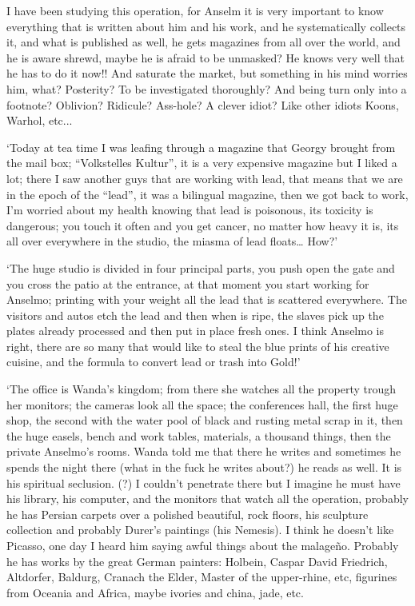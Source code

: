 \documentclass[smalldemyvopaper,11pt,twoside,onecolumn,openright,extrafontsizes]{memoir}
\begin{document}
I have been studying this operation, for Anselm it is very important to know everything that is written about him and his work, and he systematically collects it, and what is published as well, he gets magazines from all over the world, and he is aware shrewd, maybe he is afraid to be unmasked? He knows very well that he has to do it now!! And saturate the market, but something in his mind worries him, what? Posterity? To be investigated thoroughly? And being turn only into a footnote? Oblivion? Ridicule? Ass-hole? A clever idiot? Like other idiots Koons, Warhol, etc...

\ornamentbreak

‘Today at tea time I was leafing through a magazine that Georgy brought from the mail box; “Volkstelles Kultur”, it is a very expensive magazine but I liked a lot; there I saw another guys that are working with lead, that means that we are in the epoch of the “lead”, it was a bilingual magazine, then we got back to work, I’m worried about my health knowing that lead is poisonous, its toxicity is dangerous; you touch it often and you get cancer, no matter how heavy it is, its all over everywhere in the studio, the miasma of lead floats… How?’

‘The huge studio is divided in four principal parts, you push open the gate and you cross the patio at the entrance, at that moment you start working for Anselmo; printing with your weight all the lead that is scattered everywhere. The visitors and autos etch the lead and then when is ripe, the slaves pick up the plates already processed and then put in place fresh ones. I think Anselmo is right, there are so many that would like to steal the blue prints of his creative cuisine, and the formula to convert lead or trash into Gold!’

\ornamentbreak

‘The office is Wanda’s kingdom; from there she watches all the property trough her monitors; the cameras look all the space; the conferences hall, the first huge shop, the second with the water pool of black and rusting metal scrap in it, then the huge easels, bench and work tables, materials, a thousand things, then the private Anselmo’s rooms. Wanda told me that there he writes and sometimes he spends the night there (what in the fuck he writes about?) he reads as well. It is his spiritual seclusion. (?) I couldn’t penetrate there but I imagine he must have his library, his computer, and the monitors that watch all the operation, probably he has Persian carpets over a polished beautiful, rock floors, his sculpture collection and probably Durer’s paintings (his Nemesis). I think he doesn’t like Picasso, one day I heard him saying awful things about the malageño. Probably he has works by the great German painters: Holbein, Caspar David Friedrich, Altdorfer, Baldurg, Cranach the Elder, Master of the upper-rhine, etc, figurines from Oceania and Africa, maybe ivories and china, jade, etc.
\end{document}
